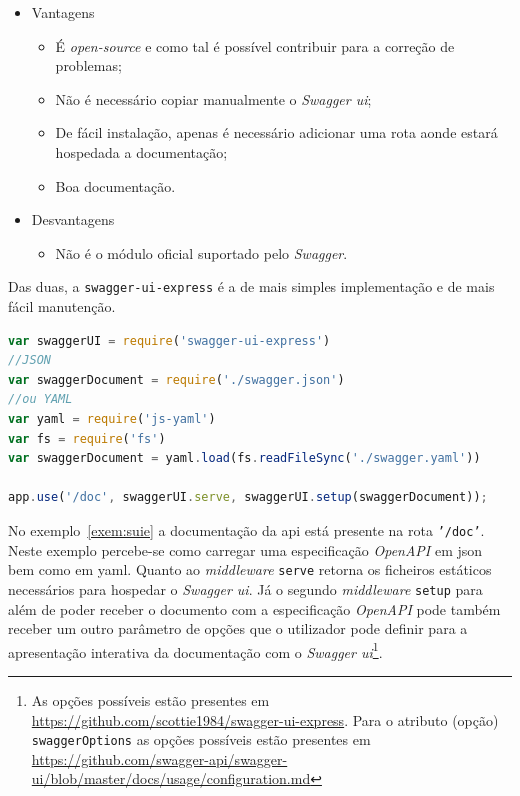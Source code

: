 \begin{itemize}
    \begin{itemize}
        \item Vantagens
        \begin{itemize}
            \item É \textit{open-source} e como tal é possível contribuir para a correção de problemas;
            \item Não é necessário copiar manualmente o \textit{Swagger \acrshort{ui}};
            \item De fácil instalação, apenas é necessário adicionar uma rota aonde estará hospedada a documentação;
            \item Boa documentação.
        \end{itemize}
        \item Desvantagens
        \begin{itemize}
            \item Não é o módulo oficial suportado pelo \textit{Swagger}.
        \end{itemize}
    \end{itemize}
\end{itemize}

Das duas, a \texttt{swagger-ui-express} é a de mais simples implementação e de mais fácil manutenção.

\begin{lstlisting}[language=javascript, caption=Exemplo de uso do \texttt{swagger-ui-express}, label=exem:suie]
var swaggerUI = require('swagger-ui-express')
//JSON
var swaggerDocument = require('./swagger.json')
//ou YAML
var yaml = require('js-yaml')
var fs = require('fs')
var swaggerDocument = yaml.load(fs.readFileSync('./swagger.yaml'))

app.use('/doc', swaggerUI.serve, swaggerUI.setup(swaggerDocument));
\end{lstlisting}

No exemplo~\ref{exem:suie} a documentação da \acrshort{api} está presente na rota \texttt{'/doc'}. 
Neste exemplo percebe-se como carregar uma especificação \textit{OpenAPI} em \acrshort{json} bem como 
em \acrshort{yaml}. Quanto ao \textit{middleware} \texttt{serve} retorna os ficheiros estáticos necessários 
para hospedar o \textit{Swagger \acrshort{ui}}. Já o segundo \textit{middleware} \texttt{setup} para além de 
poder receber o documento com a especificação \textit{OpenAPI} pode também receber um outro parâmetro de opções 
que o utilizador pode definir para a apresentação interativa da documentação com o 
\textit{Swagger \acrshort{ui}}\footnote{As opções possíveis estão presentes em \url{https://github.com/scottie1984/swagger-ui-express}. Para o atributo (opção) \texttt{swaggerOptions} as opções possíveis estão presentes em \url{https://github.com/swagger-api/swagger-ui/blob/master/docs/usage/configuration.md}}.

